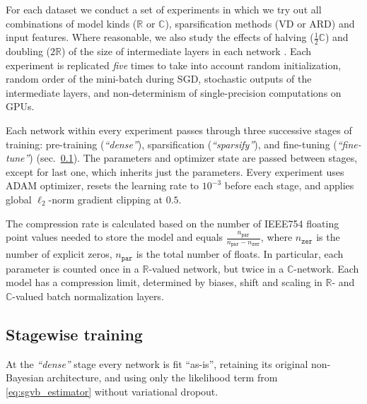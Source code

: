 \documentclass[a4paper,10pt,twocolumn]{article}
\newcommand{\real}{\mathbb{R}}
\newcommand{\cplx}{\mathbb{C}}
\begin{document}
For each dataset we conduct a set of experiments in which we try out all combinations of
model kinds ($\real$ or $\cplx$), sparsification methods (VD or ARD) and input features.
Where reasonable, we also study the effects of halving ($\tfrac12\cplx$) and doubling ($2\real$)
of the size of intermediate layers in each network \citep{monning_evaluation_2018}.
%
Each experiment is replicated \emph{five} times to take into account random initialization,
random order of the mini-batch during SGD, stochastic outputs of the intermediate layers,
and non-determinism of single-precision computations on GPUs.

Each network within every experiment passes through three successive stages of training:
pre-training (\emph{``dense''}), sparsification (\emph{``sparsify''}), and fine-tuning
(\emph{``fine-tune''}) (sec.~\ref{sub:staging}). The parameters and optimizer state are
passed between stages, except for last one, which inherits just the parameters.
%
Every experiment uses ADAM optimizer, resets the learning rate to $10^{-3}$ before each
stage, and applies global $\ell_2$-norm gradient clipping at $0.5$.

The compression rate is calculated based on the number of IEEE754 floating point values
needed to store the model and equals $
  \tfrac{n_\mathtt{par}}{n_\mathtt{par} - n_\mathtt{zer}}
$, where $n_\mathtt{zer}$ is the number of explicit zeros, $n_\mathtt{par}$ is the total
number of floats. In particular, each parameter is counted once in a $\real$-valued network,
but twice in a $\cplx$-network. Each model has a compression limit, determined by biases,
shift and scaling in $\real$- and $\cplx$-valued batch normalization layers.

\subsection{Stagewise training} %
\label{sub:staging}


At the \emph{``dense''} stage every network is fit ``as-is'', retaining its original
non-Bayesian architecture, and using only the likelihood term from \eqref{eq:sgvb_estimator} without
variational dropout.
\end{document}
